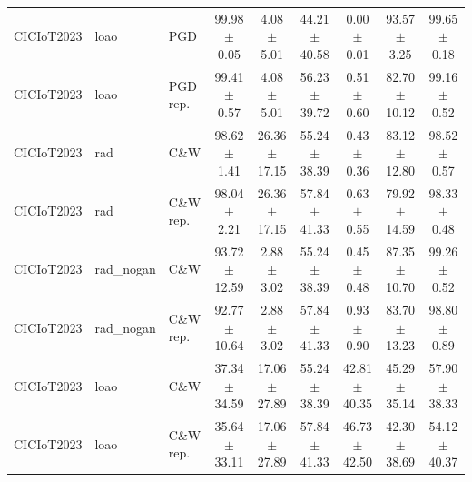 \begin{table}[t]
\begin{tabular}{lllcccccc}
CICIoT2023 & loao & PGD & 99.98 $\pm$ 0.05 & 4.08 $\pm$ 5.01 & 44.21 $\pm$ 40.58 & 0.00 $\pm$ 0.01 & 93.57 $\pm$ 3.25 & 99.65 $\pm$ 0.18 \\
CICIoT2023 & loao & PGD rep. & 99.41 $\pm$ 0.57 & 4.08 $\pm$ 5.01 & 56.23 $\pm$ 39.72 & 0.51 $\pm$ 0.60 & 82.70 $\pm$ 10.12 & 99.16 $\pm$ 0.52 \\
CICIoT2023 & rad & C\&W & 98.62 $\pm$ 1.41 & 26.36 $\pm$ 17.15 & 55.24 $\pm$ 38.39 & 0.43 $\pm$ 0.36 & 83.12 $\pm$ 12.80 & 98.52 $\pm$ 0.57 \\
CICIoT2023 & rad & C\&W rep. & 98.04 $\pm$ 2.21 & 26.36 $\pm$ 17.15 & 57.84 $\pm$ 41.33 & 0.63 $\pm$ 0.55 & 79.92 $\pm$ 14.59 & 98.33 $\pm$ 0.48 \\
CICIoT2023 & rad\_nogan & C\&W & 93.72 $\pm$ 12.59 & 2.88 $\pm$ 3.02 & 55.24 $\pm$ 38.39 & 0.45 $\pm$ 0.48 & 87.35 $\pm$ 10.70 & 99.26 $\pm$ 0.52 \\
CICIoT2023 & rad\_nogan & C\&W rep. & 92.77 $\pm$ 10.64 & 2.88 $\pm$ 3.02 & 57.84 $\pm$ 41.33 & 0.93 $\pm$ 0.90 & 83.70 $\pm$ 13.23 & 98.80 $\pm$ 0.89 \\
CICIoT2023 & loao & C\&W & 37.34 $\pm$ 34.59 & 17.06 $\pm$ 27.89 & 55.24 $\pm$ 38.39 & 42.81 $\pm$ 40.35 & 45.29 $\pm$ 35.14 & 57.90 $\pm$ 38.33 \\
CICIoT2023 & loao & C\&W rep. & 35.64 $\pm$ 33.11 & 17.06 $\pm$ 27.89 & 57.84 $\pm$ 41.33 & 46.73 $\pm$ 42.50 & 42.30 $\pm$ 38.69 & 54.12 $\pm$ 40.37 \\
\bottomrule
\end{tabular}
\end{table}
